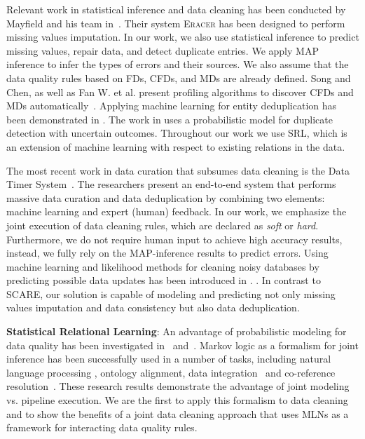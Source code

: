 Relevant work in statistical inference and data cleaning has been conducted by Mayfield and his team in~\cite{Mayfield:2010:EDA:1807167.1807178}. Their system \textsc{Eracer} has been designed to perform missing values imputation. In our work, we also use statistical inference to predict missing values, repair data, and detect duplicate entries. We apply MAP inference to infer the types of errors and their sources. We also assume that the data quality rules based on FDs, CFDs, and MDs are already defined. Song and Chen, as well as Fan W. et al. present profiling algorithms to discover CFDs and MDs automatically~\cite{song2009discovering,Fan:2011:DCF:1978258.1978514}. Applying machine learning for entity deduplication has been demonstrated in \cite{guo2010record}. The work in \cite{beskales2010probclean} uses a probabilistic model for duplicate detection with uncertain outcomes. Throughout our work we use SRL, which is an extension of machine learning with respect to existing relations in the data.

The most recent work in data curation that subsumes data cleaning is the Data Timer System~\cite{Stonebraker_datacuration}. The researchers present an end-to-end system that performs massive data curation and data deduplication by combining two elements: machine learning and expert (human) feedback. In our work, we emphasize the joint execution of data cleaning rules, which are declared as \textit{soft} or \textit{hard}. Furthermore, we do not require human input to achieve high accuracy results, instead, we fully rely on the MAP-inference results to predict errors. Using machine learning and likelihood methods for cleaning noisy databases by predicting possible data updates has been introduced in \cite{Yakout:2013:DSU:2463676.2463706}. . In contrast to \textsc{SCARE}, our solution is capable of modeling and predicting not only missing values imputation and data consistency but also data deduplication. 

\textbf{Statistical Relational Learning}: An advantage of probabilistic modeling for data quality has been investigated in~\cite{doi:10.1080/01621459.1972.10481323} and~\cite{chen2011usher}. Markov logic as a formalism for joint inference has been successfully used in a number of tasks, including natural language processing \cite{che2010jointly, riedel08collective, meza09jointly}, ontology alignment, data integration~\cite{niepert2011probabilistic} and co-reference resolution~\cite{poon2008joint,singla2006entity}. These research results demonstrate the advantage of joint modeling vs. pipeline execution. We are the first to apply this formalism to data cleaning and to show the benefits of a joint data cleaning approach that uses MLNs as a framework for interacting data quality rules. 

